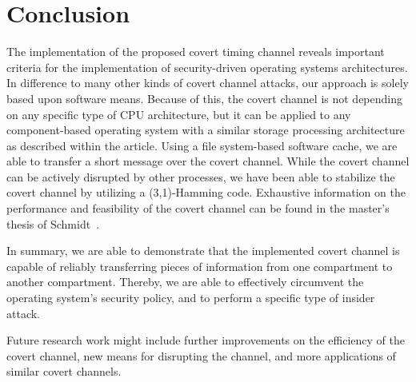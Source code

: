 \documentclass[runningheads,a4paper]{llncs}
\begin{document}
\section{Conclusion}\label{sec6}

The implementation of the proposed covert timing channel reveals important criteria for the implementation of security-driven operating systems architectures. 
In difference to many other kinds of covert channel attacks, our approach is solely based upon software means.
Because of this, the covert channel is not depending on any specific type of CPU architecture, but it can be applied to any component-based operating system with a similar storage processing architecture as described within the article.
Using a file system-based software cache, we are able to transfer a short message over the covert channel. 
While the covert channel can be actively disrupted by other processes, we have been able to stabilize the covert channel by utilizing a (3,1)-Hamming code.
Exhaustive information on the performance and feasibility of the covert channel can be found in the master's thesis of Schmidt~\cite{wschmidt}.

In summary, we are able to demonstrate that the implemented covert channel is capable of reliably transferring pieces of information from one compartment to another compartment.
Thereby, we are able to effectively circumvent the operating system's security policy, and to perform a specific type of insider attack.

Future research work might include further improvements on the efficiency of the covert channel, new means for disrupting the channel, and more applications of similar covert channels.


  
\end{document}

